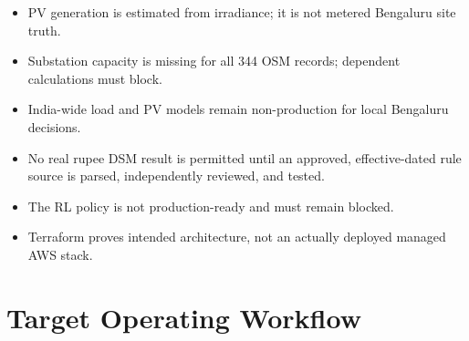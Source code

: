 \documentclass[11pt,a4paper]{article}
\begin{document}
\begin{itemize}
  \item PV generation is estimated from irradiance; it is not metered Bengaluru site truth.
  \item Substation capacity is missing for all 344 OSM records; dependent calculations must block.
  \item India-wide load and PV models remain non-production for local Bengaluru decisions.
  \item No real rupee DSM result is permitted until an approved, effective-dated rule source is
        parsed, independently reviewed, and tested.
  \item The RL policy is not production-ready and must remain blocked.
  \item Terraform proves intended architecture, not an actually deployed managed AWS stack.
\end{itemize}

\section{Target Operating Workflow}
\end{document}
